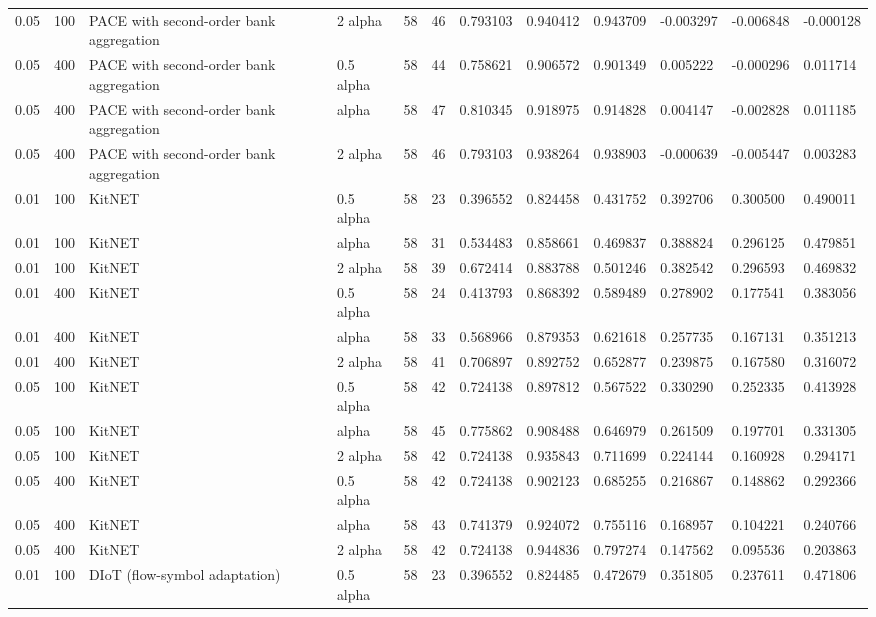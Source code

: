 \begin{tabular}{llllllllllll}
0.05 & 100 & PACE with second-order bank aggregation & 2 alpha & 58 & 46 & 0.793103 & 0.940412 & 0.943709 & -0.003297 & -0.006848 & -0.000128 \\
0.05 & 400 & PACE with second-order bank aggregation & 0.5 alpha & 58 & 44 & 0.758621 & 0.906572 & 0.901349 & 0.005222 & -0.000296 & 0.011714 \\
0.05 & 400 & PACE with second-order bank aggregation & alpha & 58 & 47 & 0.810345 & 0.918975 & 0.914828 & 0.004147 & -0.002828 & 0.011185 \\
0.05 & 400 & PACE with second-order bank aggregation & 2 alpha & 58 & 46 & 0.793103 & 0.938264 & 0.938903 & -0.000639 & -0.005447 & 0.003283 \\
0.01 & 100 & KitNET & 0.5 alpha & 58 & 23 & 0.396552 & 0.824458 & 0.431752 & 0.392706 & 0.300500 & 0.490011 \\
0.01 & 100 & KitNET & alpha & 58 & 31 & 0.534483 & 0.858661 & 0.469837 & 0.388824 & 0.296125 & 0.479851 \\
0.01 & 100 & KitNET & 2 alpha & 58 & 39 & 0.672414 & 0.883788 & 0.501246 & 0.382542 & 0.296593 & 0.469832 \\
0.01 & 400 & KitNET & 0.5 alpha & 58 & 24 & 0.413793 & 0.868392 & 0.589489 & 0.278902 & 0.177541 & 0.383056 \\
0.01 & 400 & KitNET & alpha & 58 & 33 & 0.568966 & 0.879353 & 0.621618 & 0.257735 & 0.167131 & 0.351213 \\
0.01 & 400 & KitNET & 2 alpha & 58 & 41 & 0.706897 & 0.892752 & 0.652877 & 0.239875 & 0.167580 & 0.316072 \\
0.05 & 100 & KitNET & 0.5 alpha & 58 & 42 & 0.724138 & 0.897812 & 0.567522 & 0.330290 & 0.252335 & 0.413928 \\
0.05 & 100 & KitNET & alpha & 58 & 45 & 0.775862 & 0.908488 & 0.646979 & 0.261509 & 0.197701 & 0.331305 \\
0.05 & 100 & KitNET & 2 alpha & 58 & 42 & 0.724138 & 0.935843 & 0.711699 & 0.224144 & 0.160928 & 0.294171 \\
0.05 & 400 & KitNET & 0.5 alpha & 58 & 42 & 0.724138 & 0.902123 & 0.685255 & 0.216867 & 0.148862 & 0.292366 \\
0.05 & 400 & KitNET & alpha & 58 & 43 & 0.741379 & 0.924072 & 0.755116 & 0.168957 & 0.104221 & 0.240766 \\
0.05 & 400 & KitNET & 2 alpha & 58 & 42 & 0.724138 & 0.944836 & 0.797274 & 0.147562 & 0.095536 & 0.203863 \\
0.01 & 100 & DIoT (flow-symbol adaptation) & 0.5 alpha & 58 & 23 & 0.396552 & 0.824485 & 0.472679 & 0.351805 & 0.237611 & 0.471806 \\

\end{tabular}
